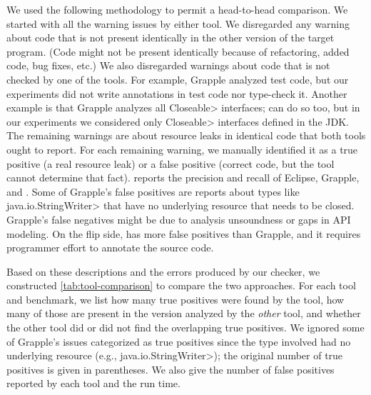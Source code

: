 We used the following methodology to permit a head-to-head comparison.
We started with all the warning issues by either tool.
We disregarded any warning about code that is not present identically in the other
version of the target program.  (Code might not be present identically because of refactoring,
added code, bug fixes, etc.)  We also disregarded warnings about code that
is not checked by one of the tools.  For example, Grapple analyzed test
code, but our experiments did not write annotations in test code nor
type-check it.  Another example is that Grapple
analyzes all \<Closeable> interfaces; \tool can do so too, but in our
experiments we considered only
\<Closeable> interfaces defined in the JDK\@.  The remaining warnings are
about resource leaks in identical code that both tools ought to report.
For each remaining warning, we manually identified it as a true positive (a
real resource leak) or a false positive (correct code, but the tool cannot
determine that fact).   reports the precision
and recall of Eclipse, Grapple, and \tool.  Some of 
Grapple's false positives are reports about types like
\<java.io.StringWriter> that have no underlying resource that needs to be closed.
Grapple's false negatives might be due to analysis unsoundness or gaps in API
modeling.
On the flip side, \tool has more false positives
than Grapple, and it requires programmer effort to annotate the source code.  

Based on these descriptions and the
errors produced by our checker, we constructed \cref{tab:tool-comparison} to compare the
two approaches.  For each tool and benchmark, we list how many true positives
were found by the tool, how many of those are present in the version analyzed by
the \emph{other} tool, and whether the other tool did or did not find the
overlapping true positives.  We ignored some of Grapple's issues categorized as
true positives since the type involved had no underlying resource (e.g.,
\<java.io.StringWriter>); the original number of true positives is given in
parentheses.  We also give the number of false positives reported by each tool and the run
time.

